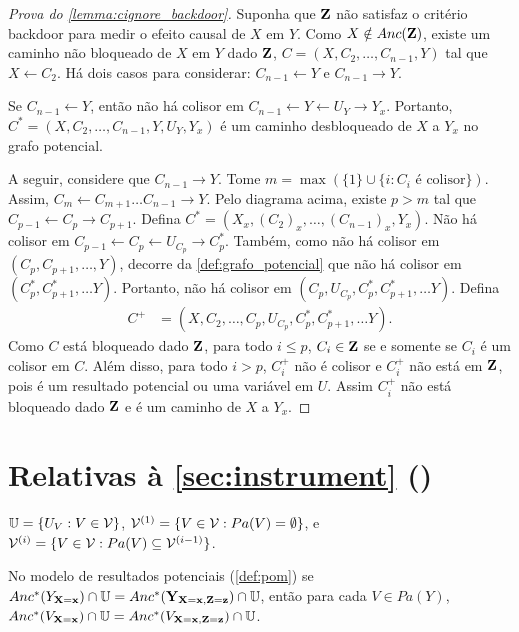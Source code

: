 \begin{proof}[Prova do \cref{lemma:cignore_backdoor}]
 Suponha que ${\mathbf{Z}}$ não satisfaz 
 o critério backdoor para medir o efeito causal de $X$ em $Y$.
 Como $X \notin Anc({\mathbf{Z}})$, existe 
 um caminho não bloqueado de $X$ em $Y$ dado ${\mathbf{Z}}$,
 $C = (X, C_2, \ldots, C_{n-1}, Y)$ tal que
 $X \leftarrow C_2$.
 Há dois casos para considerar:
 $C_{n-1} \leftarrow Y$ e $C_{n-1} \rightarrow Y$.
 
 Se $C_{n-1} \leftarrow Y$, então
 não há colisor em 
 $C_{n-1} \leftarrow Y \leftarrow U_Y \rightarrow Y_x$.
 Portanto, $C^* = (X, C_2, \ldots, C_{n-1}, Y, U_Y, Y_x)$ é
 um caminho desbloqueado de $X$ a $Y_x$ no grafo potencial.
 
 A seguir, considere que $C_{n-1} \rightarrow Y$.
 Tome $m = \max(\{1\} \cup \{i: C_i \text{ é colisor} \})$. 
 Assim, $C_m \leftarrow C_{m+1} \ldots C_{n-1} \rightarrow Y$.
 Pelo diagrama acima, existe $p > m$ tal que 
 $C_{p-1} \leftarrow C_p \rightarrow C_{p+1}$.
 Defina $C^* = (X_x, (C_2)_x, \ldots, (C_{n-1})_x, Y_x)$.
 Não há colisor em 
 $C_{p-1} \leftarrow C_p \leftarrow U_{C_p} \rightarrow C^*_p$.
 Também, como não há colisor em $(C_p, C_{p+1}, \ldots, Y)$,
 decorre da \cref{def:grafo_potencial} que
 não há colisor em $(C^*_p, C^*_{p+1}, \ldots Y)$.
 Portanto, não há colisor em
 $(C_p, U_{C_p}, C^*_p, C^*_{p+1}, \ldots Y)$.
 Defina 
 \begin{align*}
  C^+ &= (X, C_2, \ldots, C_p, U_{C_p}, C^*_p, C^*_{p+1}, \ldots Y).
 \end{align*}
 Como $C$ está bloqueado dado ${\mathbf{Z}}$,
 para todo $i \leq p$, $C_i \in {\mathbf{Z}}$ 
 se e somente se $C_i$ é um colisor em $C$.
 Além disso, para todo $i > p$,
 $C^+_i$ não é colisor e 
 $C^+_i$ não está em ${\mathbf{Z}}$, pois
 é um resultado potencial ou uma variável em $U$.
 Assim $C^+_i$ não está bloqueado dado ${\mathbf{Z}}$ e
 é um caminho de $X$ a $Y_x$.
\end{proof}

\section{Relativas à \cref{sec:instrument} ()}

\begin{definition}
 \label{def:pom_partition}
 ${\mathbb U} = \{U_V: V \in {\mathcal V}\}$,
 ${\mathcal V}^{(1)} = \{V \in {\mathcal V}: Pa(V) = \emptyset\}$, e
 ${\mathcal V}^{(i)} = \{V \in {\mathcal V}: Pa(V) \subseteq {\mathcal V}^{(i-1)}\}$.
\end{definition}

\begin{lemma}
 \label{lemma:pom_anc}
 No modelo de resultados potenciais (\cref{def:pom})
 se $Anc^*(Y_{{\mathbf{X}}={\mathbf{x}}}) \cap {\mathbb U} = Anc^*({\mathbf{Y}}_{{\mathbf{X}}={\mathbf{x}},{\mathbf{Z}}={\mathbf{z}}}) \cap {\mathbb U}$,
 então para cada $V \in Pa(Y)$,
 $Anc^*(V_{{\mathbf{X}}={\mathbf{x}}}) \cap {\mathbb U} = Anc^*(V_{{\mathbf{X}}={\mathbf{x}},{\mathbf{Z}}={\mathbf{z}}}) \cap {\mathbb U}$.
\end{lemma}

